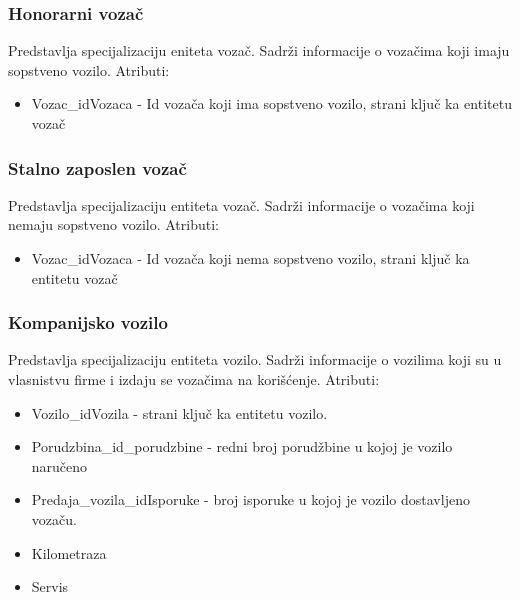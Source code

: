 \subsubsection{\textbf{Honorarni vozač}}
Predstavlja specijalizaciju eniteta vozač. Sadrži informacije o vozačima koji imaju sopstveno vozilo. Atributi:
\begin{itemize}
    \item Vozac\_idVozaca - Id vozača koji ima sopstveno vozilo, strani ključ ka entitetu vozač
\end{itemize}

\subsubsection{\textbf{Stalno zaposlen vozač}}
Predstavlja specijalizaciju entiteta vozač. Sadrži informacije o vozačima koji nemaju sopstveno vozilo. Atributi:
\begin{itemize}
    \item Vozac\_idVozaca - Id vozača koji nema sopstveno vozilo, strani ključ ka entitetu vozač
\end{itemize}

\subsubsection{\textbf{Kompanijsko vozilo}}
Predstavlja specijalizaciju entiteta vozilo. Sadrži informacije o vozilima koji su u vlasnistvu firme i izdaju se vozačima na korišćenje. Atributi:
\begin{itemize}
    \item Vozilo\_idVozila - strani ključ ka entitetu vozilo.
    \item Porudzbina\_id\_porudzbine - redni broj porudžbine u kojoj je vozilo naručeno
    \item Predaja\_vozila\_idIsporuke - broj isporuke u kojoj je vozilo dostavljeno vozaču.
    \item Kilometraza
    \item Servis
\end{itemize}







